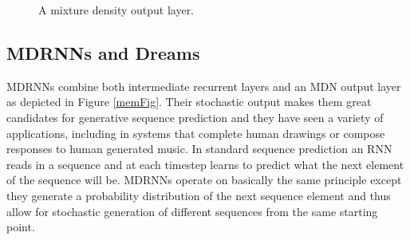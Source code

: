 \documentclass{article}
\numberwithin{figure}{section}
\theoremstyle{definition}
\begin{document}
\begin{figure}
\caption{A mixture density output layer. }
\end{figure}

\subsection{MDRNNs and Dreams}

MDRNNs combine both intermediate recurrent layers and an MDN output layer as depicted in Figure \ref{memFig}. 
Their stochastic output makes them great candidates for generative sequence prediction and they have seen a variety of applications, including in systems that complete human drawings or compose responses to human generated music. %
In standard sequence prediction an RNN reads in a sequence and at each timestep learns to predict what the next element of the sequence will be.
MDRNNs operate on basically the same principle except they generate a probability distribution of the next sequence element and thus allow for stochastic generation of different sequences from the same starting point.

\end{document}
